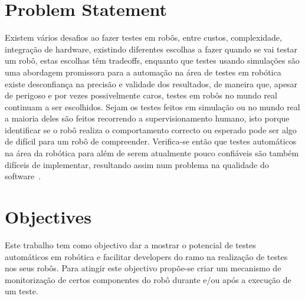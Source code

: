 \section{Problem Statement}
\label{sec:problem}


Existem vários desafios ao fazer testes em robôs, entre custos, complexidade, integração de hardware, 
existindo diferentes escolhas a fazer quando se vai testar um robô, estas escolhas têm tradeoffs, 
enquanto que testes usando simulações são uma abordagem promissora para a automação na área de testes 
em robótica existe desconfiança na precisão e validade dos resultados, de maneira que, apesar de 
perigoso e por vezes possivelmente caros, testes em robôs no mundo real continuam a ser escolhidos. 
Sejam os testes feitos em simulação ou no mundo real a maioria deles são feitos recorrendo a 
supervisionamento humano, isto porque identificar se o robô realiza o comportamento correcto ou 
esperado pode ser algo de difícil para um robô de compreender. Verifica-se então que testes automáticos 
na área da robótica para além de serem atualmente pouco confiáveis são também difíceis de implementar, 
resultando assim num problema na qualidade do software~\cite{TestRob}.

\section{Objectives}
\label{sec:objectives}

Este trabalho tem como objectivo dar a mostrar o potencial de testes automáticos em robótica e facilitar 
developers do ramo na realização de testes nos seus robôs. Para atingir este objectivo propõe-se criar 
um mecanismo de monitorização de certos componentes do robô durante e/ou após a execução de um teste. 


